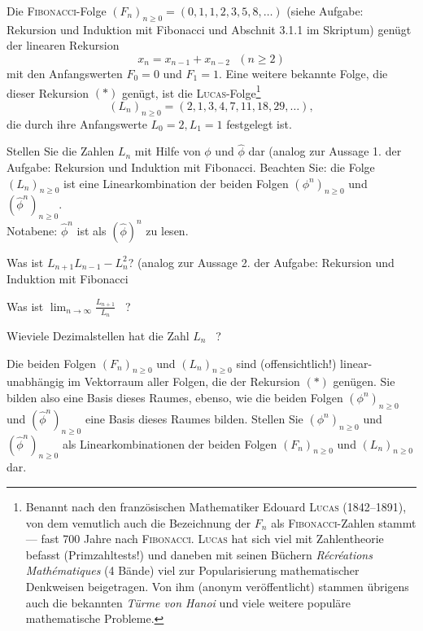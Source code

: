 Die \textsc{Fibonacci}-Folge $(F_n)_{n \geq 0} = (0,1,1,2,3,5,8,\ldots)$ (siehe Aufgabe: Rekursion und Induktion mit Fibonacci
und Abschnit 3.1.1 im Skriptum) genügt der linearen Rekursion
\begin{equation*}
x_{n} = x_{n-1} + x_{n-2}~~~(n \geq 2) \tag{$*$}
\end{equation*}
mit den Anfangswerten $F_0=0$ und $F_1=1$. Eine weitere bekannte Folge, die dieser Rekursion $(*)$
genügt, ist die \textsc{Lucas}-Folge\footnote{
Benannt nach den französischen Mathematiker Edouard \textsc{Lucas} (1842--1891), von dem
vemutlich auch die Bezeichnung der $F_n$ als \textsc{Fibonacci}-Zahlen stammt ---
fast 700 Jahre nach \textsc{Fibonacci}. 
\textsc{Lucas} hat sich viel mit Zahlentheorie befasst (Primzahltests!) und daneben mit seinen Büchern 
\emph{R\'ecr\'eations Math\'ematiques} (4 Bände) viel zur Popularisierung mathematischer
Denkweisen beigetragen. Von ihm (anonym veröffentlicht) stammen übrigens auch die 
bekannten \emph{Türme von Hanoi} und viele weitere populäre mathematische Probleme.}
\[
(L_n)_{n \geq 0} = (2,1,3,4,7,11,18,29, \ldots),
\]
die durch ihre Anfangswerte $L_0=2, L_1=1$ festgelegt ist.

\begin{flushenum}
\item Stellen Sie die Zahlen $L_n$ mit Hilfe von $\phi$ und $\widehat{\phi}$ dar (analog zur Aussage
	1. der Aufgabe: Rekursion und Induktion mit Fibonacci. Beachten Sie: die Folge $(L_n)_{n \geq 0}$ ist eine Linearkombination
	der beiden Folgen $(\phi^n)_{n \geq 0}$ und  $(\widehat{\phi}^n)_{n \geq 0}$.\\
	Notabene: $\widehat{\phi}^n$ ist als $\left( \widehat{\phi} \right)^n$ zu lesen.
\item Was ist $L_{n+1} L_{n-1} - L_n^2$? (analog  zur Aussage 2. der Aufgabe: Rekursion und Induktion mit Fibonacci
\item Was ist $\lim_{n \rightarrow \infty} \frac{L_{n+1}}{L_n}$ ~?
\item Wieviele Dezimalstellen hat die Zahl $L_n$ ~?
\item Die beiden Folgen $(F_n)_{n \geq 0}$ und $(L_n)_{n \geq 0}$ sind (offensichtlich!)
	linear-unabhängig im Vektorraum aller Folgen, die der Rekursion $(*)$ genügen. 
	Sie bilden also eine Basis dieses Raumes, ebenso, wie die beiden
	Folgen $(\phi^n)_{n \geq 0}$ und $(\widehat{\phi}^n)_{n \geq 0}$ eine Basis dieses
	Raumes bilden. Stellen Sie  $(\phi^n)_{n \geq 0}$ und $(\widehat{\phi}^n)_{n \geq 0}$
	als Linearkombinationen der beiden Folgen $(F_n)_{n \geq 0}$ und $(L_n)_{n \geq 0}$ dar.
\end{flushenum}


